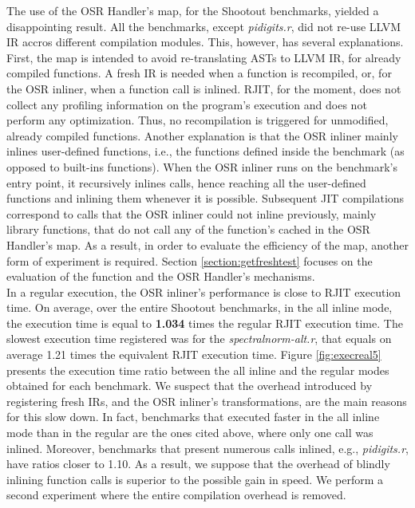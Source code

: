 The use of the OSR Handler's  map, for the Shootout benchmarks, yielded a disappointing result.
All the benchmarks, except \textit{pidigits.r}, did not re-use LLVM IR accros different compilation modules.
This, however, has several explanations.
First, the  map is intended to avoid re-translating ASTs to LLVM IR, for already compiled functions.
A fresh IR is needed when a function is recompiled, or, for the OSR inliner, when a function call is inlined.
RJIT, for the moment, does not collect any profiling information on the program's execution and does not perform any optimization. 
Thus, no recompilation is triggered for unmodified, already compiled functions.
Another explanation is that the OSR inliner mainly inlines user-defined functions, i.e., the functions defined inside the benchmark (as opposed to built-ins functions).
When the OSR inliner runs on the benchmark's entry point, it recursively inlines calls, hence reaching all the user-defined functions and inlining them whenever it is possible.
Subsequent JIT compilations correspond to calls that the OSR inliner could not inline previously, mainly library functions, that do not call any of the function's cached in the OSR Handler's map.
As a result, in order to evaluate the efficiency of the  map, another form of experiment is required.
Section \ref{section:getfreshtest} focuses on the evaluation of the  function and the OSR Handler's mechanisms.\\

In a regular execution, the OSR inliner's performance is close to RJIT execution time.
On average, over the entire Shootout benchmarks, in the all inline mode, the execution time is equal to \textbf{1.034} times the regular RJIT execution time.
The slowest execution time registered was for the \textit{spectralnorm-alt.r}, that equals on average 1.21 times the equivalent RJIT execution time.
Figure \ref{fig:execreal5} presents the execution time ratio between the all inline and the regular modes obtained for each benchmark.
We suspect that the overhead introduced by registering fresh IRs, and the OSR inliner's transformations, are the main reasons for this slow down.
In fact, benchmarks that executed faster in the all inline mode than in the regular are the ones cited above, where only one call was inlined.
Moreover, benchmarks that present numerous calls inlined, e.g., \textit{pidigits.r}, have ratios closer to 1.10.
As a result, we suppose that the overhead of blindly inlining function calls is superior to the possible gain in speed. 
We perform a second experiment where the entire compilation overhead is removed.\\

